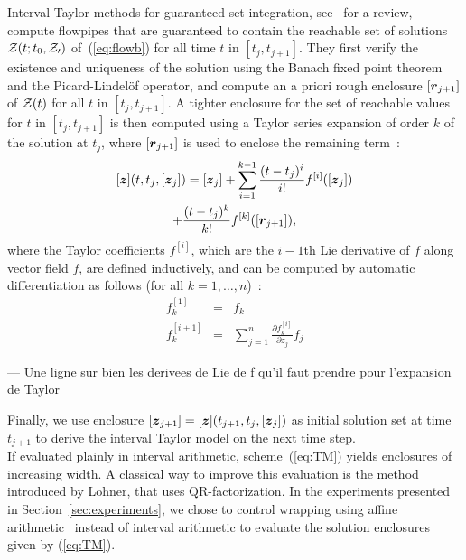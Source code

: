 \documentclass{sig-alternate-05-2015} %
\newcommand\ForAuthors[1]%
 {\par\smallskip                     %
  \begin{center}%
   \fbox%
   {\parbox{0.9\linewidth}%
    {\raggedright\sc--- #1}%
   }%
  \end{center}%
  \par\smallskip                     %
 }
\newcommand{\addTODO}[1]{\addcontentsline{tdo}{toc}{#1}}
\newcommand{\TODO}[1]{{\bf{\scriptsize #1}\addTODO{#1}}}
\newcommand{\SP}[1]{\TODO{Sylvie : #1}}
\begin{document}
Interval Taylor methods for guaranteed set integration, see~\cite{Nedialkov99} for a review, compute flowpipes that are guaranteed
 to contain the reachable set of solutions 
${\cal Z}(t;t_0, {\cal Z_0})$ of~(\ref{eq:flowb}) for all time $t$ in $[t_j,t_{j+1}]$. They first verify the existence and uniqueness of 
the solution using the Banach fixed point theorem and the Picard-Lindel\"of operator, and compute an a priori rough enclosure $[{\r}_{j+1}]$ of 
   ${\cal Z}(t)$ for all $t$ in $[t_j,t_{j+1}]$. A tighter enclosure for the set of reachable values for $t$ in $[t_j,t_{j+1}]$ is then computed 
using a Taylor series expansion of order $k$ of the solution at $t_j$, where $[{\r}_{j+1}]$ is used to enclose the remaining term~: 
\begin{multline} 
[\z](t,t_j,[{\z}_j]) =  [{\z}_j] + \sum\limits_{i=1}^{k-1} \frac{(t-t_j)^i}{i !} f^{[i]}([{\z}_j])\\
 + \frac{(t-t_j)^k}{k !} f^{[k]}([{\r}_{j+1}]),
\label{eq:TM}
\end{multline}
where the Taylor coefficients $f^{[i]}$, which are the $i-1$th Lie derivative of $f$ along
vector field $f$, are defined inductively, and 
can be computed by automatic differentiation as follows (for all $k=1,\ldots,n$)~: 
\begin{eqnarray}
f^{[1]}_k & = & f_k \\
f^{[i+1]}_k & = & \sum\limits_{j=1}^n \frac{\partial{f^{[i]}_k}}{\partial z_j} f_j
\label{Lie1}
\end{eqnarray}

\ForAuthors{Une ligne sur 
bien les derivees de Lie de f qu'il faut prendre pour l'expansion de Taylor}
Finally, we use enclosure $[{\z}_{j+1}]=[\z](t_{j+1},t_j,[{\z}_j])$ as initial solution set at time $t_{j+1}$ to derive the interval Taylor model on the next time step. \\

If evaluated plainly in interval arithmetic, scheme~(\ref{eq:TM}) yields enclosures of increasing width. A classical way to improve 
this evaluation is the method introduced by Lohner, that uses QR-factorization.
In the experiments presented in Section~\ref{sec:experiments}, we chose to control wrapping using affine arithmetic~\cite{com-sto-93-aa} instead of interval arithmetic to evaluate the solution enclosures given by (\ref{eq:TM}). 
\end{document}
